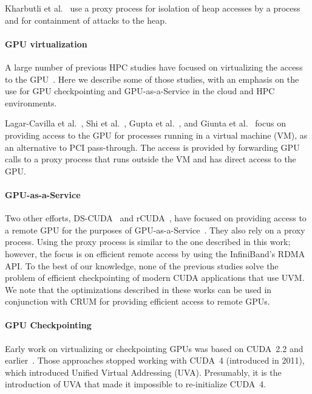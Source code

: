 \documentclass[11pt]{article}
\begin{document}
Kharbutli et al.~\cite{kharbutli2006comprehensively} use a proxy process
for isolation of heap accesses by a process and for containment of attacks
to the heap.

\paragraph{GPU virtualization}
A large number of previous HPC studies have focused on virtualizing
the access to the
GPU~\cite{lagar2007vmm,shi2009vcuda,gupta2009gvim,takizawa2009checuda,giunta2010gpgpu,takizawa2011checl,nukada2011nvcr,gtc2016crcuda}.
Here we describe some of those studies, with an emphasis on
the use for GPU checkpointing and GPU-as-a-Service in the cloud and HPC
environments.

Lagar-Cavilla et al.~\cite{lagar2007vmm}, Shi et al.~\cite{shi2009vcuda},
Gupta et al.~\cite{gupta2009gvim}, and Giunta et al.~\cite{giunta2010gpgpu}
focus on providing access to the GPU for processes running in a
virtual machine (VM), as an alternative to PCI pass-through. The
access is provided by forwarding GPU calls to a proxy process that
runs outside the VM and has direct access to the GPU.

\paragraph{GPU-as-a-Service}
Two other efforts, DS-CUDA~\cite{oikawa2012dscuda} and rCUDA~\cite{duato2010rcuda},
have focused on providing access to a remote GPU for the purposes of
GPU-as-a-Service~\cite{reano2015local,reano2015performance,varghese2015acceleration,silla2016remote,reano2017intra,reano2017enhancing,prades2017turning}.
They also rely on a proxy process. Using the proxy process is similar to the
one described in this work; however, the focus is on efficient
remote access by using the InfiniBand's RDMA API. To the best of our
knowledge, none of the previous studies solve the problem of efficient
checkpointing of modern CUDA applications that use UVM. We note that
the optimizations described in these works can be used in conjunction
with CRUM for providing efficient access to remote GPUs.

\paragraph{GPU Checkpointing}
\label{sec:gpuCkpt}
Early work on virtualizing or checkpointing
GPUs was based on CUDA~2.2 and
earlier~\cite{shi2009vcuda,gupta2009gvim,takizawa2009checuda,
gomez2010transparent,nukada2011nvcr}.  Those approaches stopped working
with CUDA~4 (introduced in 2011), which introduced Unified Virtual Addressing
(UVA).  Presumably, it is the introduction of UVA that made it impossible
to re-initialize CUDA~4.
\end{document}
